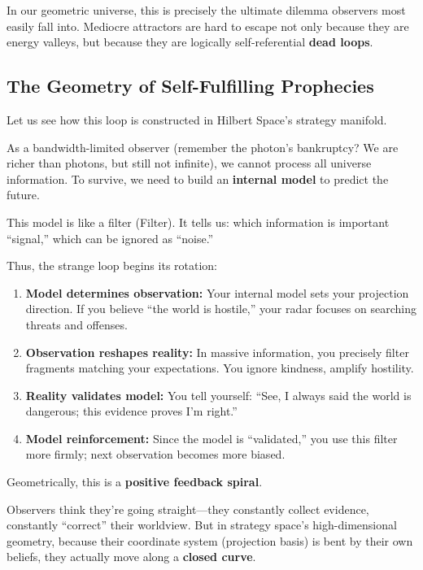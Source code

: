 \documentclass[11pt,a4paper,twoside]{book}
\begin{document}
In our geometric universe, this is precisely the ultimate dilemma observers most easily fall into. Mediocre attractors are hard to escape not only because they are energy valleys, but because they are logically self-referential \textbf{dead loops}.

\subsection{The Geometry of Self-Fulfilling Prophecies}

Let us see how this loop is constructed in Hilbert Space's strategy manifold.

As a bandwidth-limited observer (remember the photon's bankruptcy? We are richer than photons, but still not infinite), we cannot process all universe information. To survive, we need to build an \textbf{internal model} to predict the future.

This model is like a filter (Filter). It tells us: which information is important ``signal,'' which can be ignored as ``noise.''

Thus, the strange loop begins its rotation:

\begin{enumerate}
\item \textbf{Model determines observation:} Your internal model sets your projection direction. If you believe ``the world is hostile,'' your radar focuses on searching threats and offenses.

\item \textbf{Observation reshapes reality:} In massive information, you precisely filter fragments matching your expectations. You ignore kindness, amplify hostility.

\item \textbf{Reality validates model:} You tell yourself: ``See, I always said the world is dangerous; this evidence proves I'm right.''

\item \textbf{Model reinforcement:} Since the model is ``validated,'' you use this filter more firmly; next observation becomes more biased.
\end{enumerate}

Geometrically, this is a \textbf{positive feedback spiral}.

Observers think they're going straight---they constantly collect evidence, constantly ``correct'' their worldview. But in strategy space's high-dimensional geometry, because their coordinate system (projection basis) is bent by their own beliefs, they actually move along a \textbf{closed curve}.
\end{document}
